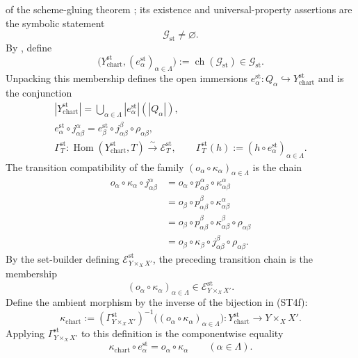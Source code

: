 \begin{definition}
  of the scheme-gluing theorem
  \cite[\href{https://stacks.math.columbia.edu/tag/01JA}{Tag 01JA}]
  {stacks-project}; its existence and universal-property assertions are the
  symbolic statement
  \[
    \mathscr G_{\mathrm{st}}\neq\varnothing.                      \tag{ST4d}
  \]
  By , define
  \[
    \bigl(Y^{\mathrm{st}}_{\mathrm{chart}},
      (e_\alpha^{\mathrm{st}})_{\alpha\in\Lambda}\bigr)
      :=\operatorname{ch}(\mathscr G_{\mathrm{st}})
      \in\mathscr G_{\mathrm{st}}.                               \tag{ST4e}
  \]
  Unpacking this membership defines the open immersions
  $e_\alpha^{\mathrm{st}}\colon
    Q_\alpha\hookrightarrow Y^{\mathrm{st}}_{\mathrm{chart}}$ and is the
  conjunction
  \[
  \begin{gathered}
    |Y^{\mathrm{st}}_{\mathrm{chart}}|
       =\bigcup_{\alpha\in\Lambda}
          |e_\alpha^{\mathrm{st}}|(|Q_\alpha|),\\
    e_\alpha^{\mathrm{st}}\circ j_{\alpha\beta}^{\alpha}
      =e_\beta^{\mathrm{st}}\circ j_{\alpha\beta}^{\beta}
        \circ\rho_{\alpha\beta},\\
    \Gamma_T^{\mathrm{st}}\colon
      \operatorname{Hom}(Y^{\mathrm{st}}_{\mathrm{chart}},T)
        \xrightarrow{\sim}\mathscr E_T^{\mathrm{st}},
    \qquad
    \Gamma_T^{\mathrm{st}}(h)
      :=(h\circ e_\alpha^{\mathrm{st}})_{\alpha\in\Lambda}.
  \end{gathered}                                                   \tag{ST4f}
  \]
  The transition compatibility of the family
  $(o_\alpha\circ\kappa_\alpha)_{\alpha\in\Lambda}$ is the chain
  \[
  \begin{aligned}
    o_\alpha\circ\kappa_\alpha\circ j_{\alpha\beta}^{\alpha}
      &=o_\alpha\circ p_{\alpha\beta}^{\alpha}\circ
          \kappa_{\alpha\beta}^{\alpha}\\
      &=o_\beta\circ p_{\alpha\beta}^{\beta}\circ
          \kappa_{\alpha\beta}^{\alpha}\\
      &=o_\beta\circ p_{\alpha\beta}^{\beta}\circ
          \kappa_{\alpha\beta}^{\beta}\circ\rho_{\alpha\beta}\\
      &=o_\beta\circ\kappa_\beta\circ
          j_{\alpha\beta}^{\beta}\circ\rho_{\alpha\beta}.
  \end{aligned}
  \]
  By the set-builder defining
  $\mathscr E_{Y\times_XX'}^{\mathrm{st}}$, the preceding transition chain is
  the membership
  \[
    (o_\alpha\circ\kappa_\alpha)_{\alpha\in\Lambda}
      \in\mathscr E_{Y\times_XX'}^{\mathrm{st}}.
  \]
  Define the ambient morphism by the inverse of the bijection in (ST4f):
  \[
    \kappa_{\mathrm{chart}}
      :=(\Gamma_{Y\times_XX'}^{\mathrm{st}})^{-1}
          \bigl((o_\alpha\circ\kappa_\alpha)_{\alpha\in\Lambda}\bigr)
      \colon Y^{\mathrm{st}}_{\mathrm{chart}}\longrightarrow Y\times_XX'.
  \]
  Applying $\Gamma_{Y\times_XX'}^{\mathrm{st}}$ to this definition is the
  componentwise equality
  \[
    \kappa_{\mathrm{chart}}\circ e_\alpha^{\mathrm{st}}
      =o_\alpha\circ\kappa_\alpha
      \qquad(\alpha\in\Lambda).                                  \tag{ST5}
  \]
\end{definition}

